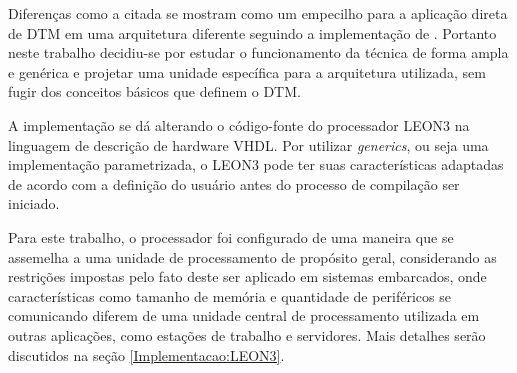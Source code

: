Diferenças como a citada se mostram como um empecilho para a aplicação direta de DTM em uma arquitetura diferente seguindo a implementação de \cite{costa2001explorando}. Portanto neste trabalho decidiu-se por estudar o funcionamento da técnica de forma ampla e genérica e projetar uma unidade específica para a arquitetura utilizada, sem fugir dos conceitos básicos que definem o DTM.

A implementação se dá alterando o código-fonte do processador LEON3 na linguagem de descrição de hardware VHDL. Por utilizar \textit{generics}, ou seja uma implementação parametrizada, o LEON3 pode ter suas características adaptadas de acordo com a definição do usuário antes do processo de compilação ser iniciado.

Para este trabalho, o processador foi configurado de uma maneira que se assemelha a uma unidade de processamento de propósito geral, considerando as restrições impostas pelo fato deste ser aplicado em sistemas embarcados, onde características como tamanho de memória e quantidade de periféricos se comunicando diferem de uma unidade central de processamento utilizada em outras aplicações, como estações de trabalho e servidores. Mais detalhes serão discutidos na seção \ref{Implementacao:LEON3}.

